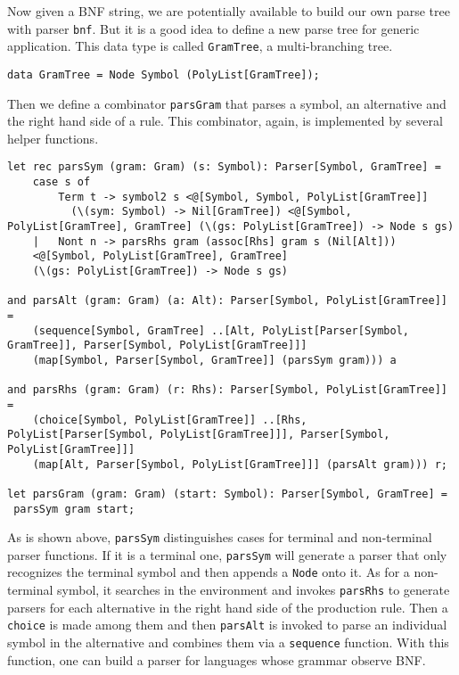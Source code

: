 Now given a BNF string, we are potentially available to build our own parse tree with parser \texttt{bnf}. But it is a good idea to define a new parse tree for generic application. This data type is called \texttt{GramTree}, a multi-branching tree.
\begin{lstlisting}
data GramTree = Node Symbol (PolyList[GramTree]);
\end{lstlisting}
Then we define a combinator \texttt{parsGram} that parses a symbol, an alternative and the right hand side of a rule. This combinator, again, is implemented by several helper functions.
\begin{lstlisting}
let rec parsSym (gram: Gram) (s: Symbol): Parser[Symbol, GramTree] =
    case s of
        Term t -> symbol2 s <@[Symbol, Symbol, PolyList[GramTree]] 
          (\(sym: Symbol) -> Nil[GramTree]) <@[Symbol, PolyList[GramTree], GramTree] (\(gs: PolyList[GramTree]) -> Node s gs)
    |   Nont n -> parsRhs gram (assoc[Rhs] gram s (Nil[Alt])) 
    <@[Symbol, PolyList[GramTree], GramTree] 
    (\(gs: PolyList[GramTree]) -> Node s gs)
    
and parsAlt (gram: Gram) (a: Alt): Parser[Symbol, PolyList[GramTree]] =
    (sequence[Symbol, GramTree] ..[Alt, PolyList[Parser[Symbol, GramTree]], Parser[Symbol, PolyList[GramTree]]] 
    (map[Symbol, Parser[Symbol, GramTree]] (parsSym gram))) a
    
and parsRhs (gram: Gram) (r: Rhs): Parser[Symbol, PolyList[GramTree]] =
    (choice[Symbol, PolyList[GramTree]] ..[Rhs, PolyList[Parser[Symbol, PolyList[GramTree]]], Parser[Symbol, PolyList[GramTree]]] 
    (map[Alt, Parser[Symbol, PolyList[GramTree]]] (parsAlt gram))) r;
    
let parsGram (gram: Gram) (start: Symbol): Parser[Symbol, GramTree] =
 parsSym gram start;
\end{lstlisting}
As is shown above, \texttt{parsSym} distinguishes cases for terminal and non-terminal parser functions. If it is a terminal one, \texttt{parsSym} will generate a parser that only recognizes the terminal symbol and then appends a \texttt{Node} onto it. As for a non-terminal symbol, it searches in the environment and invokes \texttt{parsRhs} to generate parsers for each alternative in the right hand side of the production rule. Then a \texttt{choice} is made among them and then \texttt{parsAlt} is invoked to parse an individual symbol in the alternative and combines them via a \texttt{sequence} function. With this function, one can build a parser for languages whose grammar observe BNF.

